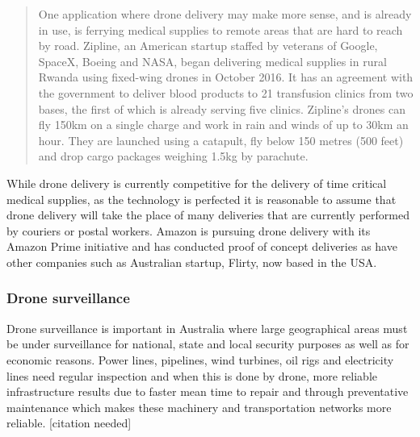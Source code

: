 \begin{quotation}
One application where drone delivery may make more sense, and is already in use, is ferrying medical supplies to remote areas that are hard to reach by road. Zipline, an American startup staffed by veterans of Google, SpaceX, Boeing and NASA, began delivering medical supplies in rural Rwanda using fixed-wing drones in October 2016. It has an agreement with the government to deliver blood products to 21 transfusion clinics from two bases, the first of which is already serving five clinics. Zipline's drones can fly 150km on a single charge and work in rain and winds of up to 30km an hour. They are launched using a catapult, fly below 150 metres (500 feet) and drop cargo packages weighing 1.5kg by parachute\cite{RefWorks:350}.

\end{quotation}
While drone delivery is currently competitive for the delivery of time critical medical supplies, as the technology is perfected it is reasonable to assume that drone delivery will take the place of many deliveries that are currently performed by couriers or postal workers. Amazon is pursuing drone delivery with its Amazon Prime initiative and has conducted proof of concept deliveries as have other companies such as Australian startup, Flirty, now based in the USA\cite{RefWorks:411}.

\subsubsection{Drone surveillance}
Drone surveillance is important in Australia where large geographical areas must be under surveillance for national, state and local security purposes as well as for economic reasons.
Power lines, pipelines, wind turbines, oil rigs and electricity lines need regular inspection and when this is done by drone, more reliable infrastructure results due to faster mean time to repair and through preventative maintenance which makes these machinery and transportation networks more reliable. [citation needed]


